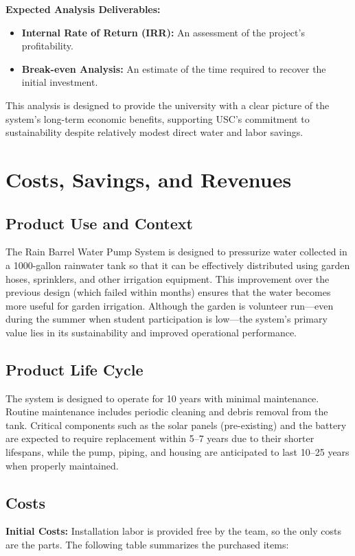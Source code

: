 \documentclass[12pt]{article}
\begin{document}
\textbf{Expected Analysis Deliverables:}
\begin{itemize}
    \item \textbf{Internal Rate of Return (IRR):} An assessment of the project’s profitability.
    \item \textbf{Break-even Analysis:} An estimate of the time required to recover the initial investment.
\end{itemize}

This analysis is designed to provide the university with a clear picture of the system’s long-term economic benefits, supporting USC’s commitment to sustainability despite relatively modest direct water and labor savings.

\newpage
\section*{Costs, Savings, and Revenues}
\vspace{-0.5em}
\subsection*{Product Use and Context}
The Rain Barrel Water Pump System is designed to pressurize water collected in a 1000-gallon rainwater tank so that it can be effectively distributed using garden hoses, sprinklers, and other irrigation equipment. This improvement over the previous design (which failed within months) ensures that the water becomes more useful for garden irrigation. Although the garden is volunteer run—even during the summer when student participation is low—the system’s primary value lies in its sustainability and improved operational performance.

\subsection*{Product Life Cycle}
The system is designed to operate for 10 years with minimal maintenance. Routine maintenance includes periodic cleaning and debris removal from the tank. Critical components such as the solar panels (pre-existing) and the battery are expected to require replacement within 5--7 years due to their shorter lifespans, while the pump, piping, and housing are anticipated to last 10--25 years when properly maintained.

\subsection*{Costs}
\textbf{Initial Costs:}  
Installation labor is provided free by the team, so the only costs are the parts. The following table summarizes the purchased items:
\end{document}
